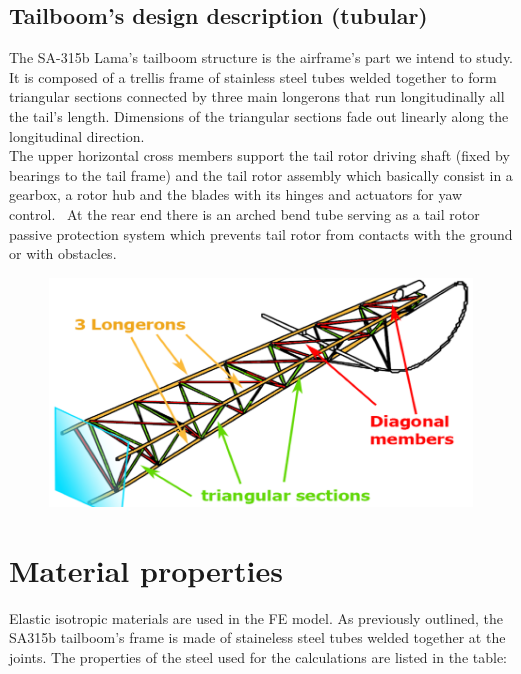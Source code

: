 \clearpage
\subsection*{Tailboom's design description (tubular)}
\noindent
The SA-315b Lama's tailboom structure is the airframe's part we intend to study. \\
It is composed of a trellis frame of stainless steel tubes welded together to form triangular sections connected by three main longerons that run longitudinally all the tail's length. Dimensions of the triangular sections fade out linearly along the longitudinal direction. \\
The upper horizontal cross members support the tail rotor driving shaft (fixed by bearings to the tail frame) and the tail rotor assembly which basically consist in a gearbox, a rotor hub and the blades with its hinges and actuators for yaw control. \ At the rear end there is an arched bend tube serving as a tail rotor passive protection system which prevents tail rotor from contacts with the ground or with obstacles. 


\begin{figure}[h]
	\begin{center}
		\centering  		 		
		\includegraphics[width=1\linewidth]{PICTURES/2_Lama_truss/PNG/tail_written.png}
	\end{center}
\end{figure}

\section*{Material properties}
\noindent
Elastic isotropic materials are used in the FE model. As previously outlined, the SA315b tailboom's frame is made of staineless steel tubes welded together at the joints. The properties of the steel used for the calculations are listed in the table:

